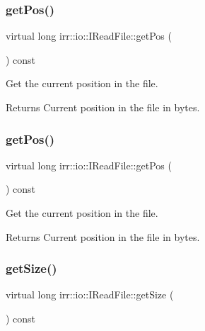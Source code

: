 \subsubsection{\texorpdfstring{get\+Pos()}{getPos()}\hspace{0.1cm}{\footnotesize\ttfamily [1/2]}}
{\footnotesize\ttfamily virtual long irr\+::io\+::\+I\+Read\+File\+::get\+Pos (\begin{DoxyParamCaption}{ }\end{DoxyParamCaption}) const\hspace{0.3cm}{\ttfamily [pure virtual]}}



Get the current position in the file. 

\begin{DoxyReturn}{Returns}
Current position in the file in bytes. 
\end{DoxyReturn}
\mbox{\label{classirr_1_1io_1_1IReadFile_aeee143ee38871c30f240c025b100941d}} 
\subsubsection{\texorpdfstring{get\+Pos()}{getPos()}\hspace{0.1cm}{\footnotesize\ttfamily [2/2]}}
{\footnotesize\ttfamily virtual long irr\+::io\+::\+I\+Read\+File\+::get\+Pos (\begin{DoxyParamCaption}{ }\end{DoxyParamCaption}) const\hspace{0.3cm}{\ttfamily [pure virtual]}}



Get the current position in the file. 

\begin{DoxyReturn}{Returns}
Current position in the file in bytes. 
\end{DoxyReturn}
\mbox{\label{classirr_1_1io_1_1IReadFile_a9c64fca7f1d665d7e458cd7d766c35a2}} 
\subsubsection{\texorpdfstring{get\+Size()}{getSize()}\hspace{0.1cm}{\footnotesize\ttfamily [1/2]}}
{\footnotesize\ttfamily virtual long irr\+::io\+::\+I\+Read\+File\+::get\+Size (\begin{DoxyParamCaption}{ }\end{DoxyParamCaption}) const\hspace{0.3cm}{\ttfamily [pure virtual]}}



